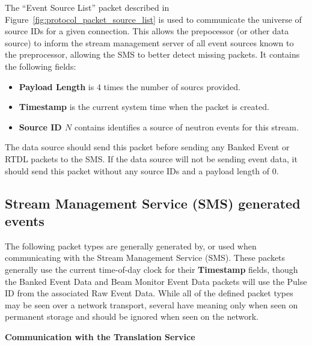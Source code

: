 The ``Event Source List'' packet described in
Figure~\ref{fig:protocol_packet_source_list} is used to communicate the
universe of source IDs for a given connection. This allows the prepocessor (or
other data source) to inform the stream management server of all event sources
known to the preprocessor, allowing the SMS to better detect missing packets.
It contains the following fields:
\begin{itemize}
\item{\bf Payload Length} is 4 times the number of sourcs provided.
\item{\bf Timestamp} is the current system time when the packet is created.
\item{\bf Source ID $N$} contains identifies a source of neutron events for
this stream.
\end{itemize}

The data source should send this packet before sending any Banked Event or RTDL
packets to the SMS. If the data source will not be sending event data, it
should send this packet without any source IDs and a payload length of 0.


\newpage
\subsection{Stream Management Service (SMS) generated events}

The following packet types are generally generated by, or used when
communicating with the Stream Management Service (SMS). These packets generally
use the current time-of-day clock for their {\bf Timestamp} fields, though the
Banked Event Data and Beam Monitor Event Data packets will use the Pulse ID
from the associated Raw Event Data.  While all of the defined packet types may
be seen over a network transport, several have meaning only when seen on
permanent storage and should be ignored when seen on the network.

{\large \bf Communication with the Translation Service}

